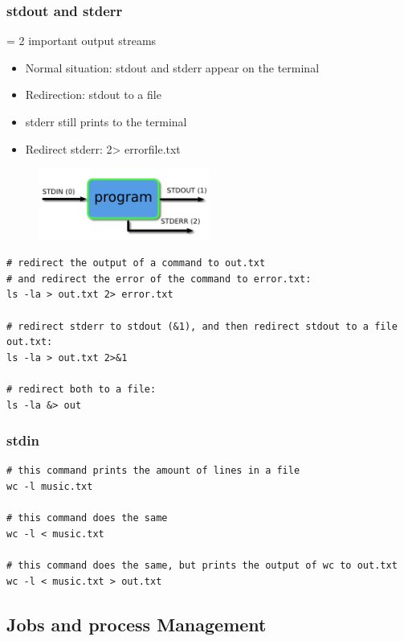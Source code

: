 \documentclass{article}
\begin{document}
\subsubsection{stdout and stderr}

= 2 important output streams

\begin{itemize}
    \item Normal situation: stdout and stderr appear on the terminal
    \item Redirection: stdout to a file
    \item stderr still prints to the terminal
    \item Redirect stderr: 2> errorfile.txt
\end{itemize}

\begin{figure}[H]
    \centering
    \includegraphics[width=0.5\textwidth]{redirection-std.png}
\end{figure}

\begin{verbatim}
# redirect the output of a command to out.txt 
# and redirect the error of the command to error.txt:
ls -la > out.txt 2> error.txt

# redirect stderr to stdout (&1), and then redirect stdout to a file out.txt:
ls -la > out.txt 2>&1

# redirect both to a file:
ls -la &> out
\end{verbatim}

\subsubsection{stdin}

\begin{verbatim}
# this command prints the amount of lines in a file
wc -l music.txt

# this command does the same
wc -l < music.txt

# this command does the same, but prints the output of wc to out.txt
wc -l < music.txt > out.txt
\end{verbatim}

\subsection{Jobs and process Management}
\end{document}
